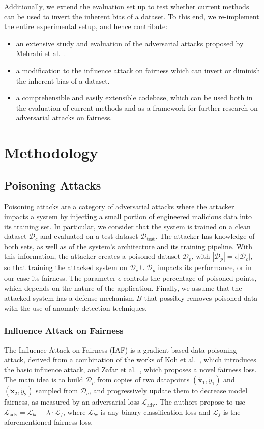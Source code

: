 Additionally, we extend the evaluation set up to test whether current methods can be used to invert the inherent bias of a dataset. To this end, we re-implement the entire experimental setup, and hence contribute:
\begin{itemize}
    \item an extensive study and evaluation of the adversarial attacks proposed by Mehrabi et al.~\cite{mehrabi2021exacerbating}.
    \item a modification to the influence attack on fairness which can invert or diminish the inherent bias of a dataset.
    \item a comprehensible and easily extensible codebase, which can be used both in the evaluation of current methods and as a framework for further research on adversarial attacks on fairness.
\end{itemize}

\section{Methodology}
\subsection{Poisoning Attacks}
Poisoning attacks are a category of adversarial attacks where the attacker impacts a system by injecting a small portion of engineered malicious data into its training set. In particular, we consider that the system is trained on a clean dataset $\mathcal{D}_c$ and evaluated on a test dataset $\mathcal{D}_{\mathrm{test}}$. The attacker has knowledge of both sets, as well as of the system's architecture and its training pipeline. With this information, the attacker creates a poisoned dataset $\mathcal{D}_p$, with $|\mathcal{D}_p| = \epsilon |\mathcal{D}_c|$, so that training the attacked system on $\mathcal{D}_c \cup \mathcal{D}_p$ impacts its performance, or in our case its fairness. The parameter $\epsilon$ controls the percentage of poisoned points, which depends on the nature of the application. Finally, we assume that the attacked system has a defense mechanism $B$ that possibly removes poisoned data with the use of anomaly detection techniques.

\subsubsection{Influence Attack on Fairness}
The Influence Attack on Fairness (IAF) is a gradient-based data poisoning attack, derived from a combination of the works of Koh et al.~\cite{koh2017}, which introduces the basic influence attack, and Zafar et al.~\cite{zafar2017fairness}, which proposes a novel fairness loss. The main idea is to build $\mathcal{D}_p$ from copies of two datapoints $(\tilde{\mathbf{x}}_1, \tilde{y}_1)$ and $(\tilde{\mathbf{x}}_2, \tilde{y}_2)$ sampled from $\mathcal{D}_c$, and progressively update them to decrease model fairness, as measured by an adversarial loss $\mathcal{L}_{\mathrm{adv}}$. The authors propose to use $\mathcal{L}_{\mathrm{adv}} = \mathcal{L}_{bc} + \lambda \cdot \mathcal{L}_{f}$, where $\mathcal{L}_{bc}$ is any binary classification loss and $\mathcal{L}_{f}$ is the aforementioned fairness loss.

